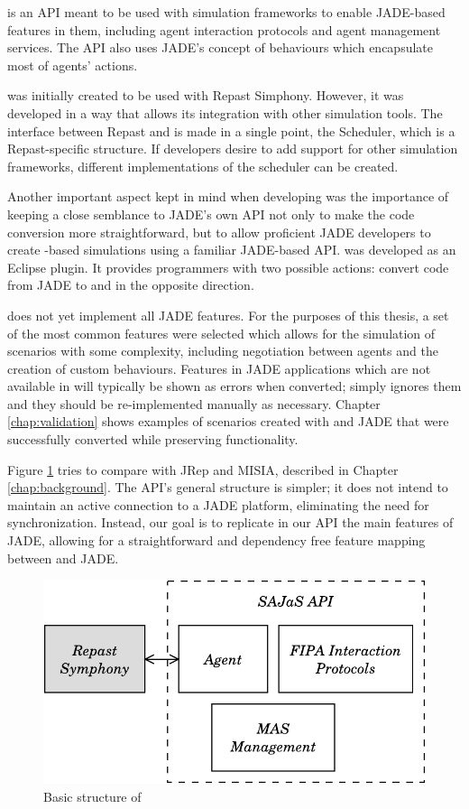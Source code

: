 \apiname{} is an API meant to be used with simulation frameworks to enable JADE-based features in them, including agent interaction protocols and agent management services. The API also uses JADE's concept of behaviours which encapsulate most of agents' actions.

\apiname{} was initially created to be used with Repast Simphony. However, it was developed in a way that allows its integration with other simulation tools. The interface between Repast and \apiname{} is made in a single point, the Scheduler, which is a Repast-specific structure. If developers desire to add support for other simulation frameworks, different implementations of the scheduler can be created.

Another important aspect kept in mind when developing \apiname{} was the importance of keeping a close semblance to JADE's own API not only to make the code  conversion more straightforward, but to allow proficient JADE developers to create \apiname{}-based simulations using a familiar JADE-based API. \plugin was developed as an Eclipse plugin. It provides programmers with two possible actions: convert code from JADE to \apiname{} and in the opposite direction.

\apiname{} does not yet implement all JADE features. For the purposes of this thesis, a set of the most common features were selected which allows for the simulation of scenarios with some complexity, including negotiation between agents and the creation of custom behaviours. Features in JADE applications which are not available in \apiname{} will typically be shown as errors when converted; \plugin simply ignores them and they should be re-implemented manually as necessary. Chapter \ref{chap:validation} shows examples of scenarios created with \apiname{} and JADE that were successfully converted while preserving functionality.

Figure \ref{fig:related-repacl} tries to compare \apiname{} with JRep and MISIA, described in Chapter \ref{chap:background}. The API's general structure is simpler; it does not intend to maintain an active connection to a JADE platform, eliminating the need for synchronization. Instead, our goal is to replicate in our API the main features of JADE, allowing for a straightforward and dependency free feature mapping between \apiname{} and JADE.

\begin{figure}
	\centering
	\includegraphics[width=0.5\linewidth]{figures/repacl.pdf}
	\caption{Basic structure of \apiname{}}
	\label{fig:related-repacl}
\end{figure}

